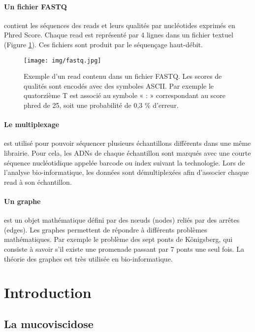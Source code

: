 \documentclass[12pt,a4paper]{article}
\begin{document}
\paragraph{Un fichier FASTQ} contient les séquences des reads et leurs qualités par nucléotides exprimés en Phred Score. Chaque read est représenté par 4 lignes dans un fichier textuel (Figure \ref{fastq}). Ces fichiers sont produit par le séquençage haut-débit.

\begin{figure}[!h]
\begin{center}
\texttt{[image: img/fastq.jpg]}\hfill
\end{center}
\caption{Exemple d'un read contenu dans un fichier FASTQ. Les scores de qualités sont encodés avec des symboles ASCII. Par exemple le quatorzième T  est associé au symbole « : » correspondant au score phred de 25, soit une probabilité de 0,3 \% d'erreur.}
\label{fastq}
\end{figure}

\paragraph{Le multiplexage} est utilisé pour pouvoir séquencer plusieurs échantillons différents dans une même librairie. Pour cela, les ADNs de chaque échantillon sont marqués avec une courte séquence nucléotidique appelée barcode ou index suivant la technologie. Lors de l'analyse bio-informatique, les données sont démultiplexées afin d'associer chaque read à son échantillon.

\paragraph{Un graphe} est un objet mathématique défini par des nœuds (nodes) reliés par des arrêtes (edges). Les graphes permettent de répondre à différents problèmes mathématiques. Par exemple le problème des sept ponts de Königsberg, qui consiste à savoir s'il existe une promenade passant par 7 ponts une seul fois. La théorie des graphes est très utilisée en bio-informatique.

\newpage

\setcounter{page}{1}

\section{Introduction}
\subsection{La mucoviscidose}
\end{document}
